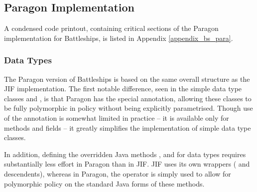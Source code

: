 %

\newpage

\subsection{Paragon Implementation}

A condensed code printout, containing critical sections of the Paragon implementation for Battleships, is listed in Appendix \ref{appendix_bs_para}.

\subsubsection{Data Types}

The Paragon version of Battleships is based on the same overall structure as the JIF implementation. The first notable difference, seen in the simple data type classes  and , is that Paragon has the special  annotation, allowing these classes to be fully polymorphic in policy without being explicitly parametrised. Though use of the  annotation is somewhat limited in practice -- it is available only for methods and  fields -- it greatly simplifies the implementation of simple data type classes.

In addition, defining the overridden Java methods ,  and  for data types requires substantially less effort in Paragon than in JIF. JIF uses its own wrappers ( and descendents), whereas in Paragon, the  operator is simply used to allow for polymorphic policy on the standard Java forms of these methods.

